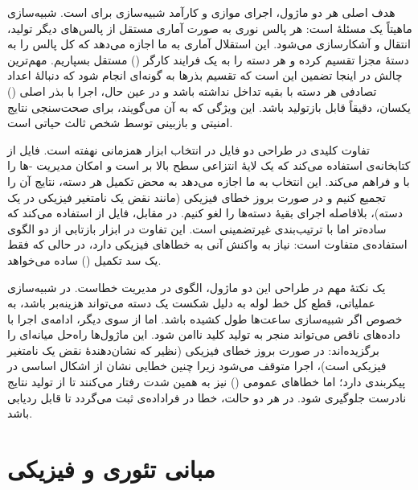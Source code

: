 هدف اصلی هر دو ماژول، اجرای موازی و کارآمد شبیه‌سازی  برای  است. شبیه‌سازی  ماهیتاً یک مسئلۀ  است: هر پالس نوری به صورت آماری مستقل از پالس‌های دیگر تولید، انتقال و آشکارسازی می‌شود. این استقلال آماری به ما اجازه می‌دهد که کل  پالس را به  دستۀ مجزا تقسیم کرده و هر دسته را به یک فرایند کارگر () مستقل بسپاریم. مهم‌ترین چالش در اینجا تضمین این است که تقسیم بذرها به گونه‌ای انجام شود که دنبالۀ اعداد تصادفی هر دسته با بقیه تداخل نداشته باشد و در عین حال، اجرا با بذر اصلی () یکسان، دقیقاً قابل بازتولید باشد. این ویژگی که به آن  می‌گویند، برای صحت‌سنجی نتایج امنیتی و بازبینی توسط شخص ثالث حیاتی است.

تفاوت کلیدی در طراحی دو فایل در انتخاب ابزار همزمانی نهفته است. فایل  از  کتابخانه‌ی  استفاده می‌کند که یک لایۀ انتزاعی سطح بالا بر  است و امکان مدیریت -ها را با  و  فراهم می‌کند. این انتخاب به ما اجازه می‌دهد به محض تکمیل هر دسته، نتایج آن را تجمیع کنیم و در صورت بروز خطای فیزیکی (مانند نقض یک نامتغیر فیزیکی در یک دسته)، بلافاصله اجرای بقیۀ دسته‌ها را لغو کنیم. در مقابل، فایل  از  استفاده می‌کند که ساده‌تر اما با ترتیب‌بندی غیرتضمینی است. این تفاوت در ابزار بازتابی از دو الگوی استفاده‌ی متفاوت است:  نیاز به واکنش آنی به خطاهای فیزیکی دارد، در حالی که  فقط یک سد تکمیل () ساده می‌خواهد.

یک نکتۀ مهم در طراحی این دو ماژول، الگوی  در مدیریت خطاست. در شبیه‌سازی  عملیاتی، قطع کل خط لوله به دلیل شکست یک دسته می‌تواند هزینه‌بر باشد، به خصوص اگر شبیه‌سازی ساعت‌ها طول کشیده باشد. اما از سوی دیگر، ادامه‌ی اجرا با داده‌های ناقص می‌تواند منجر به تولید کلید ناامن شود. این ماژول‌ها راه‌حل میانه‌ای را برگزیده‌اند: در صورت بروز خطای فیزیکی (نظیر  که نشان‌دهندۀ نقض یک نامتغیر فیزیکی است)، اجرا متوقف می‌شود زیرا چنین خطایی نشان از اشکال اساسی در پیکربندی دارد؛ اما خطاهای عمومی () نیز به همین شدت رفتار می‌کنند تا از تولید نتایج نادرست جلوگیری شود. در هر دو حالت، خطا در فراداده‌ی  ثبت می‌گردد تا قابل ردیابی باشد.

\section{مبانی تئوری و فیزیکی}

